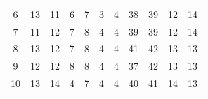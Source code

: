 \begin{table}[ht]
\begin{tabular}{| c | c | c | c | c | c | c | c | c | c | c |}
6 & 13 & 11 & 6 & 7 & 3 & 4 & 38 & 39 & 12 & 14\\

7 & 11 & 12 & 7 & 8 & 4 & 4 & 39 & 39 & 12 & 14\\

8 & 13 & 12 & 7 & 8 & 4 & 4 & 41 & 42 & 13 & 13\\

9 & 12 & 12 & 8 & 8 & 4 & 4 & 37 & 42 & 13 & 13\\ 

10 & 13 & 14 & 4 & 7 & 4 & 4 & 40 & 41 & 14 & 13\\ [1ex] %

\hline %

\end{tabular}
\label{table:tena} %
\end{table}


